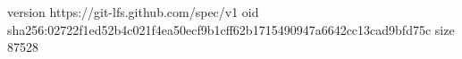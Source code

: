 version https://git-lfs.github.com/spec/v1
oid sha256:02722f1ed52b4c021f4ea50ecf9b1cff62b1715490947a6642cc13cad9bfd75c
size 87528
